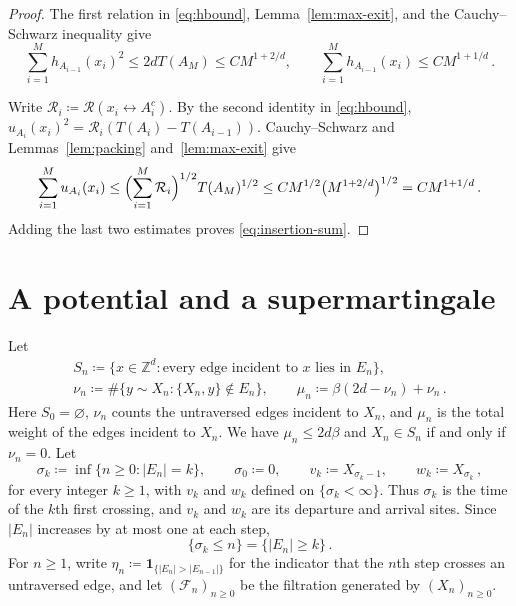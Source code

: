 \documentclass[11pt]{amsart}
\theoremstyle{plain}
\theoremstyle{definition}
\newcommand{\Z}{\mathbb Z}
\newcommand{\one}{\mathbf 1}
\newcommand{\Reff}{\mathcal R}
\begin{document}
	\begin{proof}
		The first relation in \eqref{eq:hbound}, Lemma~\ref{lem:max-exit}, and the
		Cauchy--Schwarz inequality give
		\[
		\sum_{i=1}^Mh_{A_{i-1}}(x_i)^2\leq2dT(A_M)\leq CM^{1+2/d},
		\qquad
		\sum_{i=1}^Mh_{A_{i-1}}(x_i)\leq CM^{1+1/d}\, .
		\]

		Write $\Reff_i\coloneqq\Reff(x_i\leftrightarrow A_i^c)$. By the second
		identity in \eqref{eq:hbound},
		$u_{A_i}(x_i)^2=\Reff_i(T(A_i)-T(A_{i-1}))$.
		Cauchy--Schwarz and Lemmas~\ref{lem:packing} and~\ref{lem:max-exit} give
		\[
		\sum_{i=1}^Mu_{A_i}(x_i)
		\leq\Bigl(\sum_{i=1}^M\Reff_i\Bigr)^{1/2}T(A_M)^{1/2}
		\leq CM^{1/2}\bigl(M^{1+2/d}\bigr)^{1/2}=CM^{1+1/d}\, .
		\]
		Adding the last two estimates proves \eqref{eq:insertion-sum}.
	\end{proof}

	\section{A potential and a supermartingale}\label{sec:potential}

	Let
	\[
		\begin{gathered}
		S_n\coloneqq\{x\in\Z^d:\text{every edge incident to $x$ lies in $E_n$}\},\\
		\nu_n\coloneqq\#\{y\sim X_n:\{X_n,y\}\notin E_n\},
		\qquad
		\mu_n\coloneqq\beta(2d-\nu_n)+\nu_n\, .
		\end{gathered}
	\]
	Here $S_0=\varnothing$, $\nu_n$ counts the untraversed edges incident to
	$X_n$, and $\mu_n$ is the total weight of the edges incident to $X_n$.
	We have $\mu_n\leq2d\beta$ and $X_n\in S_n$ if and only if $\nu_n=0$. Let
	\[
		\sigma_k\coloneqq\inf\{n\geq0:|E_n|=k\},
		\qquad\sigma_0\coloneqq0,
		\qquad v_k\coloneqq X_{\sigma_k-1},
		\qquad w_k\coloneqq X_{\sigma_k}\, ,
	\]
	for every integer $k\geq1$, with $v_k$ and $w_k$ defined on
	$\{\sigma_k<\infty\}$. Thus $\sigma_k$ is the time of the $k$th first
	crossing, and $v_k$ and $w_k$ are its departure and arrival sites.  Since $|E_n|$ increases by at most one at each step,
	\begin{equation}\label{eq:sigma-range}
		\{\sigma_k\leq n\}=\{|E_n|\geq k\}\, .
	\end{equation}
	For $n\geq1$, write $\eta_n\coloneqq\one_{\{|E_n|>|E_{n-1}|\}}$ for the indicator that the
	$n$th step crosses an untraversed edge, and let $(\mathcal F_n)_{n\geq0}$ be
	the filtration generated by $(X_n)_{n\geq0}$.
\end{document}
